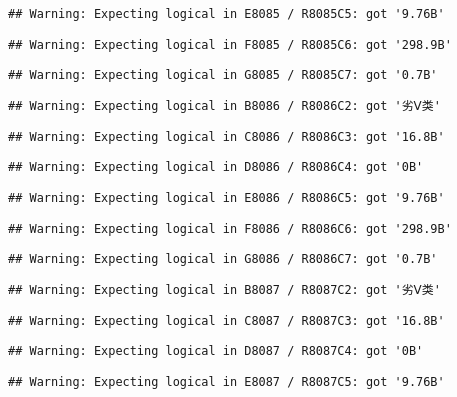 \documentclass[
]{article}
\begin{document}
\begin{verbatim}
## Warning: Expecting logical in E8085 / R8085C5: got '9.76B'
\end{verbatim}

\begin{verbatim}
## Warning: Expecting logical in F8085 / R8085C6: got '298.9B'
\end{verbatim}

\begin{verbatim}
## Warning: Expecting logical in G8085 / R8085C7: got '0.7B'
\end{verbatim}

\begin{verbatim}
## Warning: Expecting logical in B8086 / R8086C2: got '劣Ⅴ类'
\end{verbatim}

\begin{verbatim}
## Warning: Expecting logical in C8086 / R8086C3: got '16.8B'
\end{verbatim}

\begin{verbatim}
## Warning: Expecting logical in D8086 / R8086C4: got '0B'
\end{verbatim}

\begin{verbatim}
## Warning: Expecting logical in E8086 / R8086C5: got '9.76B'
\end{verbatim}

\begin{verbatim}
## Warning: Expecting logical in F8086 / R8086C6: got '298.9B'
\end{verbatim}

\begin{verbatim}
## Warning: Expecting logical in G8086 / R8086C7: got '0.7B'
\end{verbatim}

\begin{verbatim}
## Warning: Expecting logical in B8087 / R8087C2: got '劣Ⅴ类'
\end{verbatim}

\begin{verbatim}
## Warning: Expecting logical in C8087 / R8087C3: got '16.8B'
\end{verbatim}

\begin{verbatim}
## Warning: Expecting logical in D8087 / R8087C4: got '0B'
\end{verbatim}

\begin{verbatim}
## Warning: Expecting logical in E8087 / R8087C5: got '9.76B'
\end{verbatim}
\end{document}
